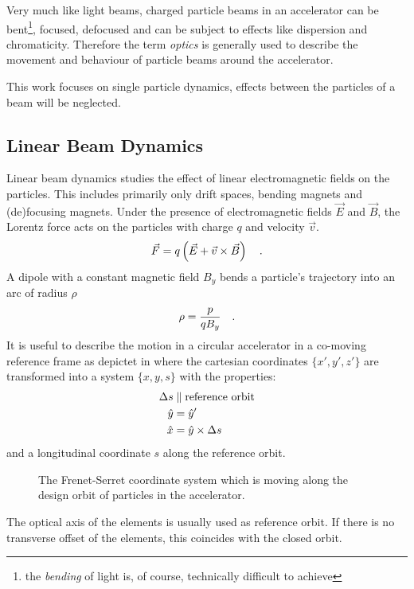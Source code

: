 Very much like light beams, charged particle beams in an accelerator can be bent\footnote{%
the \emph{bending} of light is, of course, technically difficult to achieve}, focused, defocused
and can be subject to effects like dispersion and chromaticity. Therefore the term \emph{optics} is
generally used to describe the movement and behaviour of particle beams around the accelerator.

This work focuses on single particle dynamics, effects between the particles of a beam will be
neglected. 

\subsection{Linear Beam Dynamics}

Linear beam dynamics studies the effect of linear electromagnetic fields on the particles.
This includes primarily only drift spaces, bending magnets and (de)focusing magnets. Under the presence
of electromagnetic fields $\vec{E}$ and $\vec{B}$, the Lorentz force acts on the particles with charge
$q$ and velocity $\vec{v}$.
%
\begin{equation}
    \vec{F} = q\left(\vec{E} + \vec{v} \times \vec{B}\right)
    \quad .
    \label{eq_lorentz_force}
\end{equation}
%
A dipole with a constant magnetic field $B_y$ bends a particle's trajectory into an arc of radius $\rho$
%
\begin{equation}
    \rho = \frac{p}{qB_y}
    \quad .
    \label{eq_acc_radius}
\end{equation}
%
It is useful to describe the motion in a circular accelerator in a co-moving reference frame as
depictet in  where the cartesian coordinates $\{x', y', z'\}$ are
transformed into a system $\{x,y,s\}$ with the properties:
%
\begin{align}
    \Delta s &\parallel \text{reference orbit}\notag\\
    \hat{y} &= \hat{y}'\notag\\
    \hat{x} &= \hat{y} \times \Delta s
\end{align}
%
and a longitudinal coordinate $s$ along the reference orbit.
\begin{figure}[ht]
    
    \caption{
        The Frenet-Serret coordinate system which is moving along the design orbit of particles
        in the accelerator.
    }
    \label{fig_frenet_serret}
\end{figure}
%
The optical axis of the elements is usually used as reference orbit.
If there is no transverse offset of the elements, this coincides with the closed orbit.

